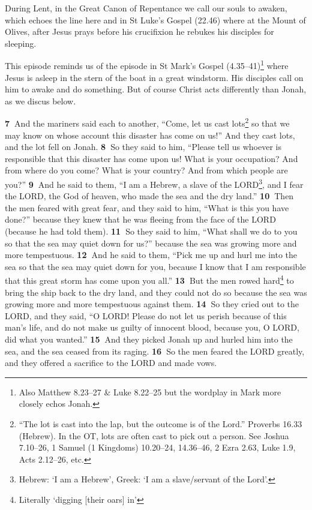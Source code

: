 \documentclass[
]{article}
\newcommand{\RL}[1]{\beginR #1\endR}
\begin{document}
During Lent, in the Great Canon of Repentance we call our souls to
awaken, which echoes the line here and in St Luke's Gospel (22.46) where
at the Mount of Olives, after Jesus prays before his crucifixion he
rebukes his disciples for sleeping.

This episode reminds us of the episode in St Mark's Gospel
(4.35--41)\footnote{Also Matthew 8.23--27 \& Luke 8.22--25 but the
  wordplay in Mark more closely echos Jonah.} where Jesus is asleep in
the stern of the boat in a great windstorm. His disciples call on him to
awake and do something. But of course Christ acts differently than
Jonah, as we discus below.

\textbf{7~}And the mariners said each to another, \RL{``}Come, let us
cast lots\footnote{``The lot is cast into the lap, but the outcome is of
  the Lord.'' Proverbs 16.33 (Hebrew). In the OT, lots are often cast to
  pick out a person. See Joshua 7.10--26, 1 Samuel (1 Kingdoms)
  10.20--24, 14.36--46, 2 Ezra 2.63, Luke 1.9, Acts 2.12--26, etc.} so
that we may know on whose account this disaster has come on us!'' And
they cast lots, and the lot fell on Jonah. \textbf{8~}So they said to
him, \RL{``}Please tell us whoever is responsible that this disaster has
come upon us! What is your occupation? And from where do you come? What
is your country? And from which people are you?'' \textbf{9~}And he said
to them, \RL{``}I am a Hebrew, a slave of the LORD\footnote{Hebrew: `I
  am a Hebrew', Greek: `I am a slave/servant of the Lord'.}, and I fear
the LORD, the God of heaven, who made the sea and the dry land.''
\textbf{10~}Then the men feared with great fear, and they said to him,
\RL{``}What is this you have done?'' because they knew that he was
fleeing from the face of the LORD (because he had told them).
\textbf{11~}So they said to him, \RL{``}What shall we do to you so that
the sea may quiet down for us?'' because the sea was growing more and
more tempestuous. \textbf{12~}And he said to them, \RL{``}Pick me up and
hurl me into the sea so that the sea may quiet down for you, because I
know that I am responsible that this great storm has come upon you
all.'' \textbf{13~}But the men rowed hard\footnote{Literally `digging
  {[}their oars{]} in'} to bring the ship back to the dry land, and they
could not do so because the sea was growing more and more tempestuous
against them. \textbf{14~}So they cried out to the LORD, and they said,
\RL{``}O LORD! Please do not let us perish because of this man\RL{'}s
life, and do not make us guilty of innocent blood, because you, O LORD,
did what you wanted.'' \textbf{15~}And they picked Jonah up and hurled
him into the sea, and the sea ceased from its raging. \textbf{16~}So the
men feared the LORD greatly, and they offered a sacrifice to the LORD
and made vows.
\end{document}
